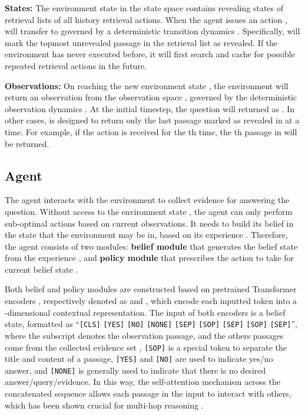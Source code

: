 \documentclass[11pt]{article}
\begin{document}
\textbf{States:} 
The environment state  in the state space  contains revealing states of retrieval lists of all history retrieval actions.
When the agent issues an action ,  will transfer to  governed by a deterministic transition dynamics .
Specifically,  will mark the topmost unrevealed passage in the retrieval list  as revealed. 
If the environment has never executed  before, it will first search and cache  for possible repeated retrieval actions in the future.

\textbf{Observations:}
On reaching the new environment state , the environment will return an observation  from the observation space , governed by the deterministic observation dynamics . 
At the initial timestep, the question  will returned as .
In other cases,  is designed to return only the last passage marked as revealed in  at a time.
For example, if the action  is received for the th time, the th passage in  will be returned.

\subsection{Agent}\label{agent}
The agent interacts with the environment to collect evidence for answering the question.
Without access to the environment state , the agent can only perform sub-optimal actions based on current observations. 
It needs to build its belief  in the state that the environment may be in, based on its experience .
Therefore, the agent consists of two modules: \textbf{belief module}  that generates the belief state  from the experience , and \textbf{policy module}  that prescribes the action  to take for current belief state .

Both belief and policy modules are constructed based on pretrained Transformer encoders \citep{Clark2020ELECTRA}, respectively denoted as  and , which encode each inputted token into a -dimensional contextual representation.
The input of both encoders is a belief state, formatted as ``\verb|[CLS]| \verb|[YES]| \verb|[NO]| \verb|[NONE]|  \verb|[SEP]|  \verb|[SOP]|  \verb|[SEP]|  \verb|[SOP]|   \verb|[SEP]|'', where the subscript  denotes the observation passage, and the others passages come from the collected evidence set , \verb|[SOP]| is a special token to separate the title and content of a passage, \verb|[YES]| and \verb|[NO]| are used to indicate yes/no answer, and \verb|[NONE]| is generally used to indicate that there is no desired answer/query/evidence.
In this way, the self-attention mechanism across the concatenated sequence allows each passage in the input to interact with others, which has been shown crucial for multi-hop reasoning \citep{wang-etal-2019-multi-hop}.
\end{document}
